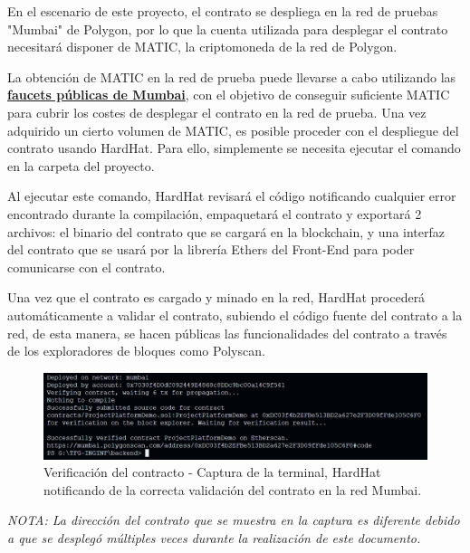 En el escenario de este proyecto, el contrato se despliega en la red de pruebas "Mumbai" de Polygon, por lo que la cuenta utilizada para desplegar el contrato necesitará disponer de MATIC, la criptomoneda de la red de Polygon.

\bigskip

La obtención de MATIC en la red de prueba puede llevarse a cabo utilizando las \textcolor{blue}{\href{https://mumbaifaucet.com/}{\textbf{faucets públicas de Mumbai}}}, con el objetivo de conseguir suficiente MATIC para cubrir los costes de desplegar el contrato en la red de prueba. Una vez adquirido un cierto volumen de MATIC, es posible proceder con el despliegue del contrato usando HardHat. Para ello, simplemente se necesita ejecutar el comando  en la carpeta  del proyecto.

\bigskip

Al ejecutar este comando, HardHat revisará el código notificando cualquier error encontrado durante la compilación, empaquetará el contrato y exportará 2 archivos: el binario del contrato que se cargará en la blockchain, y una interfaz del contrato que se usará por la librería Ethers del Front-End para poder comunicarse con el contrato.

\bigskip

Una vez que el contrato es cargado y minado en la red, HardHat procederá automáticamente a validar el contrato, subiendo el código fuente del contrato a la red, de esta manera, se hacen públicas las funcionalidades del contrato a través de los exploradores de bloques como Polyscan.

\begin{figure}[H]
        \centering
        \includegraphics[width=1\textwidth]{img/capturas/validated.png}
        \caption{Verificación del contracto - Captura de la terminal, HardHat notificando de la correcta validación del contrato en la red Mumbai.}
        \label{fig:configApi}
\end{figure}

\textit{NOTA: La dirección del contrato que se muestra en la captura es diferente debido a que se desplegó múltiples veces durante la realización de este documento.}

